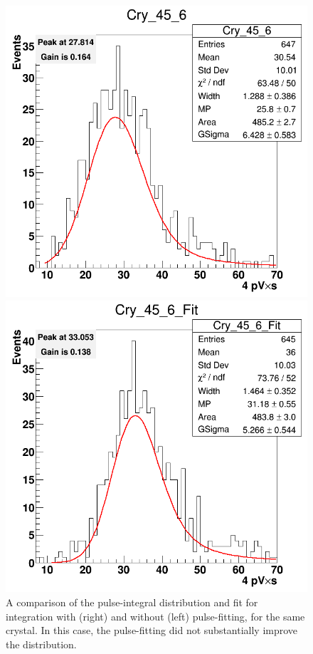 \documentclass[twoside]{article}
\begin{document}
\begin{figure}[hbt]
\begin{minipage}{0.5\textwidth}
 \includegraphics[width=\textwidth]{pics/Cry_45_6.png}
\end{minipage}\hfill\begin{minipage}{0.5\textwidth}
 \includegraphics[width=\textwidth]{pics/Cry_45_6_Fit.png}
 \end{minipage}
  \caption{A comparison of the pulse-integral distribution and fit for integration with (right) and without (left) pulse-fitting, for the same crystal. In this case, the pulse-fitting did not  substantially improve the distribution.}
  \label{fig:compareResults}
\end{figure}
\end{document}

